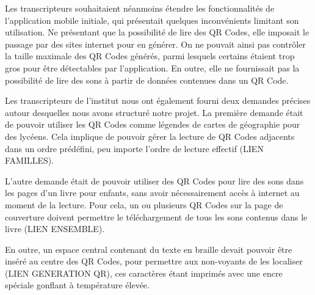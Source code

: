 \par
Les transcripteurs souhaitaient néanmoins étendre les fonctionnalités de l'application mobile initiale, qui présentait quelques inconvénients limitant son utilisation. Ne présentant que la possibilité de lire des QR Codes, elle imposait le passage par des sites internet pour en générer. On ne pouvait ainsi pas contrôler la taille maximale des QR Codes générés, parmi lesquels certains étaient trop gros pour être détectables par l'application. En outre, elle ne fournissait pas la possibilité de lire des sons à partir de données contenues dans un QR Code.\\

\par
Les transcripteurs de l'institut nous ont également fourni deux demandes précises autour desquelles nous avons structuré notre projet. La première demande était de pouvoir utiliser les QR Codes comme légendes de cartes de géographie pour des lycéens. Cela implique de pouvoir gérer la lecture de QR Codes adjacents dans un ordre prédéfini, peu importe l'ordre de lecture effectif (LIEN FAMILLES).
\par
L'autre demande était de pouvoir utiliser des QR Codes pour lire des sons dans les pages d'un livre pour enfants, sans avoir nécessairement accès à internet au moment de la lecture. Pour cela, un ou plusieurs QR Codes sur la page de couverture doivent permettre le téléchargement de tous les sons contenus dans le livre (LIEN ENSEMBLE).
\par
En outre, un espace central contenant du texte en braille devait pouvoir être inséré au centre des QR Codes, pour permettre aux non-voyants de les localiser (LIEN GENERATION QR), ces caractères étant imprimés avec une encre spéciale gonflant à température élevée.